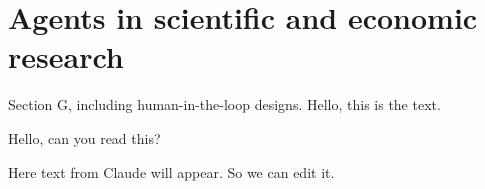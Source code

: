 \section{Agents in scientific and economic research}

Section G, including human-in-the-loop designs.
Hello, this is the text.

Hello, can you read this?

Here text from Claude will appear.
So we can edit it.
